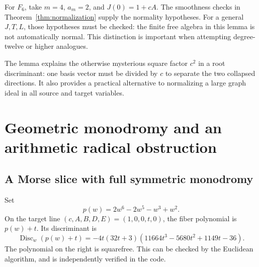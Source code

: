 \documentclass[11pt,a4paper]{article}
\theoremstyle{definition}
\newcommand{\Disc}{\operatorname{Disc}}
\begin{document}
For $F_6$, take $m=4$, $a_m=2$, and $J(0)=1+cA$.
The smoothness checks in Theorem~\ref{thm:normalization} supply the
normality hypotheses. For a general $J,T,L$, those hypotheses must be
checked: the finite free algebra in this lemma is not automatically
normal. This distinction is important when attempting degree-twelve or
higher analogues.

The lemma explains the otherwise mysterious square factor $c^2$ in a
root discriminant: one basis vector must be divided by $c$ to separate
the two collapsed directions. It also provides a practical alternative
to normalizing a large graph ideal in all source and target variables.

\section{Geometric monodromy and an arithmetic radical obstruction}
\label{sec:galois}

\subsection{A Morse slice with full symmetric monodromy}
Set
\[
 p(w)=2w^6-2w^5-w^3+w^2.
\]
On the target line $(c,A,B,D,E)=(1,0,0,t,0)$, the fiber polynomial is
$p(w)+t$. Its discriminant is
\begin{equation}\label{eq:morsedisc}
 \Disc_w(p(w)+t)
 =-4t(32t+3)(11664t^3-5680t^2+1149t-36).
\end{equation}
The polynomial on the right is squarefree. This can be checked by the
Euclidean algorithm, and is independently verified in the code.
\end{document}
